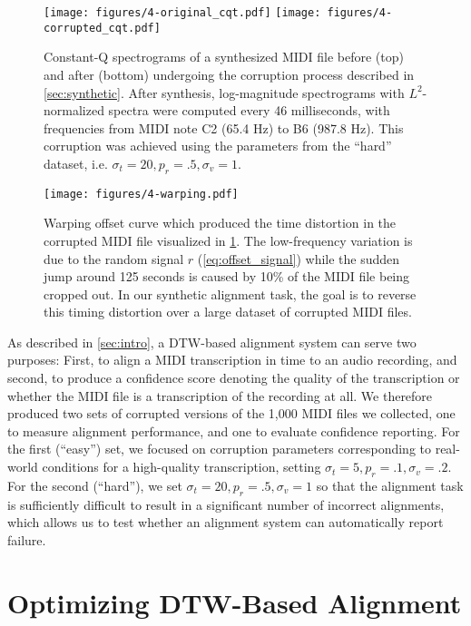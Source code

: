 \begin{figure}
  \centering
  \texttt{[image: figures/4-original\_cqt.pdf]}
  \texttt{[image: figures/4-corrupted\_cqt.pdf]}
  \caption[Constant-Q spectrograms of a MIDI file before and after corruption]{Constant-Q spectrograms of a synthesized MIDI file before (top) and after (bottom) undergoing the corruption process described in \cref{sec:synthetic}.
After synthesis, log-magnitude spectrograms with $L^2$-normalized spectra were computed every 46 milliseconds, with frequencies from MIDI note C2 (65.4 Hz) to B6 (987.8 Hz).
This corruption was achieved using the parameters from the ``hard'' dataset, i.e. $\sigma_t = 20, p_r = .5, \sigma_v = 1$.}
  \label{fig:corruption}
\end{figure}

\begin{figure}
  \centering
  \texttt{[image: figures/4-warping.pdf]}
  \caption[Example synthetic warping offset]{Warping offset curve which produced the time distortion in the corrupted MIDI file visualized in \cref{fig:corruption}.
The low-frequency variation is due to the random signal $r$ (\cref{eq:offset_signal}) while the sudden jump around 125 seconds is caused by 10\% of the MIDI file being cropped out.
In our synthetic alignment task, the goal is to reverse this timing distortion over a large dataset of corrupted MIDI files.}
  \label{fig:warping}
\end{figure}

As described in \cref{sec:intro}, a DTW-based alignment system can serve two purposes: First, to align a MIDI transcription in time to an audio recording, and second, to produce a confidence score denoting the quality of the transcription or whether the MIDI file is a transcription of the recording at all.
We therefore produced two sets of corrupted versions of the 1,000 MIDI files we collected, one to measure alignment performance, and one to evaluate confidence reporting.
For the first (``easy'') set, we focused on corruption parameters corresponding to real-world conditions for a high-quality transcription, setting $\sigma_t = 5, p_r = .1, \sigma_v = .2$.
For the second (``hard''), we set $\sigma_t = 20, p_r = .5, \sigma_v = 1$ so that the alignment task is sufficiently difficult to result in a significant number of incorrect alignments, which allows us to test whether an alignment system can automatically report failure.

\section{Optimizing DTW-Based Alignment}
\label{sec:optimizing}

